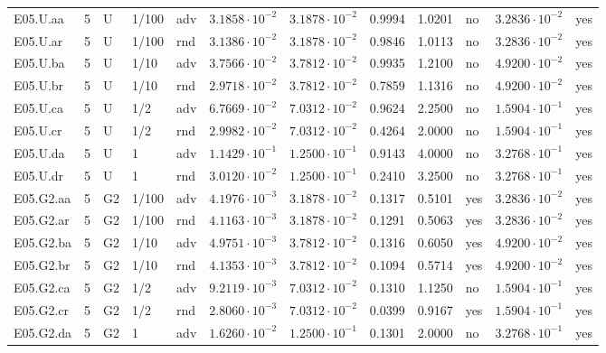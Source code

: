 {\begin{longtable}{@{}lllllllllll l@{}}
E05.U.aa & 5 & U & 1/100 & adv & $3.1858\cdot 10^{-2}$ & $3.1878\cdot 10^{-2}$ & 0.9994 & 1.0201 & no & $3.2836\cdot 10^{-2}$ & yes \\
E05.U.ar & 5 & U & 1/100 & rnd & $3.1386\cdot 10^{-2}$ & $3.1878\cdot 10^{-2}$ & 0.9846 & 1.0113 & no & $3.2836\cdot 10^{-2}$ & yes \\
E05.U.ba & 5 & U & 1/10 & adv & $3.7566\cdot 10^{-2}$ & $3.7812\cdot 10^{-2}$ & 0.9935 & 1.2100 & no & $4.9200\cdot 10^{-2}$ & yes \\
E05.U.br & 5 & U & 1/10 & rnd & $2.9718\cdot 10^{-2}$ & $3.7812\cdot 10^{-2}$ & 0.7859 & 1.1316 & no & $4.9200\cdot 10^{-2}$ & yes \\
E05.U.ca & 5 & U & 1/2 & adv & $6.7669\cdot 10^{-2}$ & $7.0312\cdot 10^{-2}$ & 0.9624 & 2.2500 & no & $1.5904\cdot 10^{-1}$ & yes \\
E05.U.cr & 5 & U & 1/2 & rnd & $2.9982\cdot 10^{-2}$ & $7.0312\cdot 10^{-2}$ & 0.4264 & 2.0000 & no & $1.5904\cdot 10^{-1}$ & yes \\
E05.U.da & 5 & U & 1 & adv & $1.1429\cdot 10^{-1}$ & $1.2500\cdot 10^{-1}$ & 0.9143 & 4.0000 & no & $3.2768\cdot 10^{-1}$ & yes \\
E05.U.dr & 5 & U & 1 & rnd & $3.0120\cdot 10^{-2}$ & $1.2500\cdot 10^{-1}$ & 0.2410 & 3.2500 & no & $3.2768\cdot 10^{-1}$ & yes \\
E05.G2.aa & 5 & G2 & 1/100 & adv & $4.1976\cdot 10^{-3}$ & $3.1878\cdot 10^{-2}$ & 0.1317 & 0.5101 & yes & $3.2836\cdot 10^{-2}$ & yes \\
E05.G2.ar & 5 & G2 & 1/100 & rnd & $4.1163\cdot 10^{-3}$ & $3.1878\cdot 10^{-2}$ & 0.1291 & 0.5063 & yes & $3.2836\cdot 10^{-2}$ & yes \\
E05.G2.ba & 5 & G2 & 1/10 & adv & $4.9751\cdot 10^{-3}$ & $3.7812\cdot 10^{-2}$ & 0.1316 & 0.6050 & yes & $4.9200\cdot 10^{-2}$ & yes \\
E05.G2.br & 5 & G2 & 1/10 & rnd & $4.1353\cdot 10^{-3}$ & $3.7812\cdot 10^{-2}$ & 0.1094 & 0.5714 & yes & $4.9200\cdot 10^{-2}$ & yes \\
E05.G2.ca & 5 & G2 & 1/2 & adv & $9.2119\cdot 10^{-3}$ & $7.0312\cdot 10^{-2}$ & 0.1310 & 1.1250 & no & $1.5904\cdot 10^{-1}$ & yes \\
E05.G2.cr & 5 & G2 & 1/2 & rnd & $2.8060\cdot 10^{-3}$ & $7.0312\cdot 10^{-2}$ & 0.0399 & 0.9167 & yes & $1.5904\cdot 10^{-1}$ & yes \\
E05.G2.da & 5 & G2 & 1 & adv & $1.6260\cdot 10^{-2}$ & $1.2500\cdot 10^{-1}$ & 0.1301 & 2.0000 & no & $3.2768\cdot 10^{-1}$ & yes \\

\end{longtable}}
